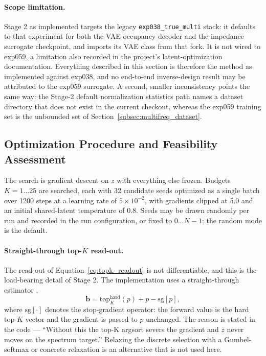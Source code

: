 \paragraph{Scope limitation.} Stage 2 as implemented targets the legacy
\texttt{exp038\_true\_multi} stack: it defaults to that experiment for both the VAE occupancy decoder
and the impedance surrogate checkpoint, and imports its VAE class from that fork. It is not wired to
exp059, a limitation also recorded in the project's latent-optimization documentation. Everything
described in this section is therefore the method as implemented against exp038, and no end-to-end
inverse-design result may be attributed to the exp059 surrogate. A second, smaller inconsistency
points the same way: the Stage-2 default normalization statistics path names a dataset directory that
does not exist in the current checkout, whereas the exp059 training set is the unbounded set of
Section~\ref{subsec:multifreq_dataset}.

\subsection{Optimization Procedure and Feasibility Assessment}
\label{subsec:opt_procedure_feasibility}

The search is gradient descent on $z$ with everything else frozen. Budgets $K = 1 \dots 25$ are
searched, each with 32 candidate seeds optimized as a single batch over 1200 steps at a learning rate
of $5 \times 10^{-2}$, with gradients clipped at 5.0 and an initial shared-latent temperature of 0.8.
Seeds may be drawn randomly per run and recorded in the run configuration, or fixed to $0 \dots N-1$;
the random mode is the default.

\paragraph{Straight-through top-$K$ read-out.} The read-out of
Equation~\ref{eq:topk_readout} is not differentiable, and this is the load-bearing detail of Stage 2.
The implementation uses a straight-through estimator \cite{bengio2013straight},
\begin{equation}
\mathbf{b} = \mathrm{top}_K^{\mathrm{hard}}(p) + p - \mathrm{sg}[p],
\label{eq:ste_design}
\end{equation}
where $\mathrm{sg}[\cdot]$ denotes the stop-gradient operator: the forward value is the hard top-$K$
vector and the gradient is passed to $p$ unchanged. The reason is stated in the code --- ``Without
this the top-K argsort severs the gradient and $z$ never moves on the spectrum target.'' Relaxing the
discrete selection with a Gumbel-softmax or concrete relaxation \cite{jang2016gumbel,
maddison2016concrete} is an alternative that is not used here.

